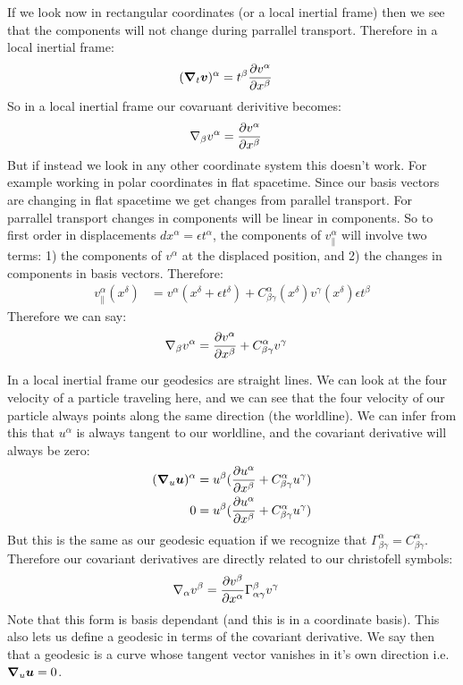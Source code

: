 If we look now in rectangular coordinates (or a local inertial frame) then we see that the components will not change during parrallel transport. Therefore in a local inertial frame:
\begin{align*}
	(\bm{\nabla}_t \bm{v})^\alpha &= t^\beta \frac{\partial v^\alpha}{\partial x^\beta}
\end{align*}
So in a local inertial frame our covaruant derivitive becomes:
\begin{align*}
	\nabla_\beta v^\alpha &= \frac{\partial v^\alpha}{\partial x^\beta}
\end{align*}
But if instead we look in any other coordinate system this doesn't work. For example working in polar coordinates in flat spacetime. Since our basis vectors are changing in flat spacetime we get changes from parallel transport.
For parrallel transport changes in components will be linear in components. So to first order in displacements $dx^\alpha = \epsilon t^\alpha$, the components of $v^\alpha_\parallel$ will involve two terms:
1) the components of $v^\alpha$ at the displaced position, and 2) the changes in components in basis vectors. Therefore:
\begin{align*}
	v^\alpha_\parallel(x^\delta) &= v^\alpha(x^\delta + \epsilon t^\delta) + C^\alpha_{\beta\gamma}(x^\delta) v^\gamma(x^\delta) \epsilon t^\beta
\end{align*}
Therefore we can say:
\begin{align*}
	\nabla_\beta v^\alpha &= \frac{\partial v^\alpha}{\partial x^\beta} + C^\alpha_{\beta\gamma} v^\gamma
\end{align*}

In a local inertial frame our geodesics are straight lines. We can look at the four velocity of a particle traveling here, and we can see that the four velocity of our particle always points along the same direction (the worldline).
We can infer from this that $u^\alpha$ is always tangent to our worldline, and the covariant derivative will always be zero:
\begin{align*}
	(\bm{\nabla}_u \bm{u})^\alpha &= u^\beta (\frac{\partial u^\alpha}{\partial x^\beta} + C^\alpha_{\beta\gamma} u^\gamma) \\
	0 &= u^\beta (\frac{\partial u^\alpha}{\partial x^\beta} + C^\alpha_{\beta\gamma} u^\gamma) \\
\end{align*}
But this is the same as our geodesic equation if we recognize that $\Gamma^\alpha_{\beta\gamma} = C^\alpha_{\beta\gamma}$. Therefore our covariant derivatives are directly related to our christofell symbols:
\begin{align*}
	\nabla_\alpha v^\beta &= \frac{\partial v^\beta}{\partial x^\alpha} \Gamma^\beta_{\alpha\gamma} v^\gamma
\end{align*}
Note that this form is basis dependant (and this is in a coordinate basis). This also lets us define a geodesic in terms of the covariant derivative. We say then that a geodesic is a curve whose tangent vector vanishes in it's own direction i.e. $\bm{\nabla}_u \bm{u} = 0$.

